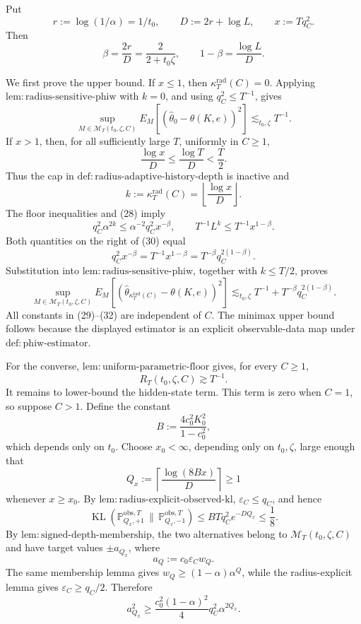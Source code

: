 Put
\[
 r:=\log(1/\alpha)=1/t_0,
 \qquad
 D:=2r+\log L,
 \qquad
 x:=Tq_C^2.
\]
Then
\[
 \beta=\frac{2r}{D}=\frac{2}{2+t_0\zeta},
 \qquad
 1-\beta=\frac{\log L}{D}. \tag{28}
\]

We first prove the upper bound.  If \(x\le1\), then
\(\kappa_T^{\mathrm{rad}}(C)=0\).  Applying
\(\mathrm{lem{:}radius\text{-}sensitive\text{-}phiw}\) with \(k=0\), and using
\(q_C^2\le T^{-1}\), gives
\[
 \sup_{M\in\mathcal M_T(t_0,\zeta,C)}
 E_M[(\widehat\theta_0-\theta(K,e))^2]
 \lesssim_{t_0,\zeta}T^{-1}. \tag{29}
\]
If \(x>1\), then, for all sufficiently large \(T\), uniformly in \(C\ge1\),
\[
 \frac{\log x}{D}\le\frac{\log T}{D}<\frac T2.
\]
Thus the cap in
\(\mathrm{def{:}radius\text{-}adaptive\text{-}history\text{-}depth}\) is inactive and
\[
 k:=\kappa_T^{\mathrm{rad}}(C)=\left\lfloor\frac{\log x}{D}\right\rfloor.
\]
The floor inequalities and (28) imply
\[
 q_C^2\alpha^{2k}
 \le\alpha^{-2}q_C^2x^{-\beta},
 \qquad
 T^{-1}L^k
 \le T^{-1}x^{1-\beta}. \tag{30}
\]
Both quantities on the right of (30) equal
\[
 q_C^2x^{-\beta}
 =T^{-1}x^{1-\beta}
 =T^{-\beta}q_C^{2(1-\beta)}. \tag{31}
\]
Substitution into
\(\mathrm{lem{:}radius\text{-}sensitive\text{-}phiw}\), together with \(k\le T/2\), proves
\[
 \sup_{M\in\mathcal M_T(t_0,\zeta,C)}
 E_M[(\widehat\theta_{\kappa_T^{\mathrm{rad}}(C)}-\theta(K,e))^2]
 \lesssim_{t_0,\zeta}
 T^{-1}+T^{-\beta}q_C^{2(1-\beta)}. \tag{32}
\]
All constants in (29)--(32) are independent of \(C\).  The minimax upper
bound follows because the displayed estimator is an explicit observable-data
map under \(\mathrm{def{:}phiw\text{-}estimator}\).

For the converse,
\(\mathrm{lem{:}uniform\text{-}parametric\text{-}floor}\) gives, for every \(C\ge1\),
\[
 R_T(t_0,\zeta,C)\gtrsim T^{-1}. \tag{33}
\]
It remains to lower-bound the hidden-state term.  This term is zero when
\(C=1\), so suppose \(C>1\).  Define the constant
\[
 B:=\frac{4c_0^2K_0^2}{1-c_0^2},
\]
which depends only on \(t_0\).  Choose \(x_0<\infty\), depending only on
\(t_0,\zeta\), large enough that
\[
 Q_x:=\left\lceil\frac{\log(8Bx)}D\right\rceil\ge1
\]
whenever \(x\ge x_0\).  By
\(\mathrm{lem{:}radius\text{-}explicit\text{-}observed\text{-}kl}\),
\(\varepsilon_C\le q_C\), and hence
\[
 \operatorname{KL}(\mathbb P_{Q_x,+1}^{\mathrm{obs},T}\,\|\,
                    \mathbb P_{Q_x,-1}^{\mathrm{obs},T})
 \le BTq_C^2e^{-DQ_x}\le\frac18. \tag{34}
\]
By \(\mathrm{lem{:}signed\text{-}depth\text{-}membership}\), the two alternatives
belong to \(\mathcal M_T(t_0,\zeta,C)\) and have target values \(\pm a_{Q_x}\),
where
\[
 a_Q:=c_0\varepsilon_Cw_Q.
\]
The same membership lemma gives \(w_Q\ge(1-\alpha)\alpha^Q\), while the
radius-explicit lemma gives \(\varepsilon_C\ge q_C/2\).  Therefore
\[
 a_{Q_x}^2
 \ge\frac{c_0^2(1-\alpha)^2}{4}q_C^2\alpha^{2Q_x}. \tag{35}
\]


